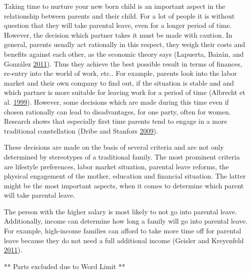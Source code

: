 \documentclass[
  11pt,
]{article}
\begin{document}
Taking time to nurture your new born child is an important aspect in the relationship between parents and their child. For a lot of people it is without question that they will take parental leave, even for a longer period of time.
However, the decision which partner takes it must be made with caution. In general, parents usually act rationally in this respect, they weigh their costs and benefits against each other, as the economic theory says (Lapuerta, Baizán, and González \protect\hyperlink{ref-lapuerta_individual_2011}{2011}). Thus they achieve the best possible result in terms of finances, re-entry into the world of work, etc..
For example, parents look into the labor market and their own company to find out, if the situation is stable and and which partner is more suitable for leaving work for a period of time (Albrecht et al. \protect\hyperlink{ref-albrecht_career_1999}{1999}). However, some decisions which are made during this time even if chosen rationally can lead to disadvantages, for one party, often for women. Research shows that especially first time parents tend to engage in a more traditional constellation (Dribe and Stanfors \protect\hyperlink{ref-dribe_does_2009}{2009}).

These decisions are made on the basis of several criteria and are not only determined by stereotypes of a traditional family. The most prominent criteria are lifestyle preferences, labor market situation, parental leave reforms, the physical engagement of the mother, education and financial situation. The latter might be the most important aspects, when it comes to determine which parent will take parental leave.

The person with the higher salary is most likely to not go into parental leave. Additionally, income can determine how long a family will go into parental leave. For example, high-income families can afford to take more time off for parental leave because they do not need a full additional income (Geisler and Kreyenfeld \protect\hyperlink{ref-geisler_against_2011}{2011}).

** Parts excluded due to Word Limit **
\end{document}
